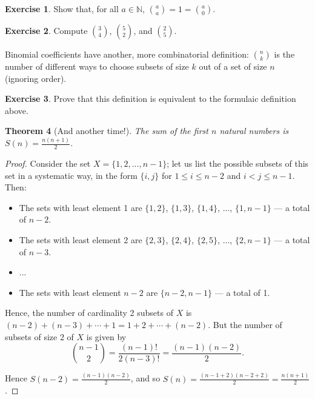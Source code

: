 \documentclass[a4paper]{amsart}
\newtheorem{thm}{Theorem}[section]
\theoremstyle{definition}
\newtheorem{exercise}[thm]{Exercise}
\theoremstyle{remark}
\begin{document}
\begin{exercise}
  Show that, for all $ a \in \mathbb{N} $, $ \binom{a}{a} = 1 = \binom{a}{0} $.
\end{exercise}

\begin{exercise}
  Compute $ \binom{3}{4} $, $ \binom{5}{2} $, and $ \binom{2}{5} $.
\end{exercise}

Binomial coefficients have another, more combinatorial definition: $ \binom{n}{k} $ is the number of different ways to choose subsets of size $ k $
out of a set of size $ n $ (ignoring order).

\begin{exercise}
  Prove that this definition is equivalent to the formulaic definition above.
\end{exercise}

\begin{thm}[And another time!]\label{ex:w2}
  The sum of the first $ n $ natural numbers is $ S(n) = \frac{n(n+1)}{2} $.
\end{thm}
\begin{proof}
  Consider the set $ X = \{1, 2, ..., n-1\} $; let us list the possible subsets of this set in a systematic way, in the form $ \{i,j\} $
  for $ 1 \leq i \leq n - 2 $ and $ i < j \leq n - 1 $. Then:
  \begin{itemize}
    \item The sets with least element 1 are $ \{1, 2\} $, $ \{1, 3\} $, $ \{1, 4\} $, ..., $ \{1, n-1\} $ --- a total of $ n - 2 $.
    \item The sets with least element 2 are $ \{2, 3\} $, $ \{2, 4\} $, $ \{2, 5\} $, ..., $ \{2, n-1\} $ --- a total of $ n - 3 $.
    \item ...
    \item The sets with least element $ n - 2 $ are $ \{n - 2, n - 1\} $ --- a total of 1.
  \end{itemize}

  Hence, the number of cardinality 2 subsets of $ X $ is $ (n - 2) + (n - 3) + \cdots + 1 = 1 + 2 + \cdots + (n - 2) $. But the number
  of subsets of size 2 of $ X $ is given by
  \begin{displaymath}
    \binom{n - 1}{2} = \frac{(n - 1)!}{2(n - 3)!} = \frac{(n-1)(n-2)}{2}.
  \end{displaymath}

  Hence $ S(n - 2) = \frac{(n-1)(n-2)}{2} $, and so $ S(n) = \frac{(n - 1 + 2)(n - 2 + 2)}{2} = \frac{n(n+1)}{2} $.
\end{proof}
\end{document}
